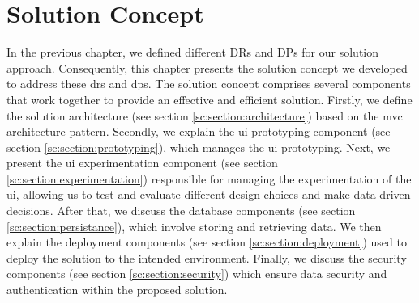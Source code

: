 
\chapter{Solution Concept}
\label{chap:concept}
\ifpdf
    \graphicspath{{Chapters/Solution-Concept/Figs/}{Chapters/Solution-Concept/Figs/}{Chapters/Solution-Concept/Figs/}}
\else
    \graphicspath{{Chapters/Solution-Concept/Figs/}{Chapters/Solution-Concept/Figs/}}
\fi
In the previous chapter, we defined different DRs and DPs for our solution approach. 
Consequently, this chapter presents the solution concept we developed to address these \ac{dr}s and \ac{dp}s.
The solution concept comprises several components that work together to provide an effective and efficient solution. 
Firstly, we define the solution architecture (see section \ref{sc:section:architecture}) based on the \ac{mvc} architecture pattern. 
Secondly, we explain the \ac{ui} prototyping component (see section \ref{sc:section:prototyping}), which manages the \ac{ui} prototyping. 
Next, we present the \ac{ui} experimentation component (see section \ref{sc:section:experimentation}) responsible for managing the experimentation of the \ac{ui}, allowing us to test and evaluate different design choices and make data-driven decisions.
After that, we discuss the database components (see section \ref{sc:section:persistance}), which involve storing and retrieving data.
We then explain the deployment components (see section \ref{sc:section:deployment}) used to deploy the solution to the intended environment.
Finally, we discuss the security components (see section \ref{sc:section:security}) which ensure data security and authentication within the proposed solution.


